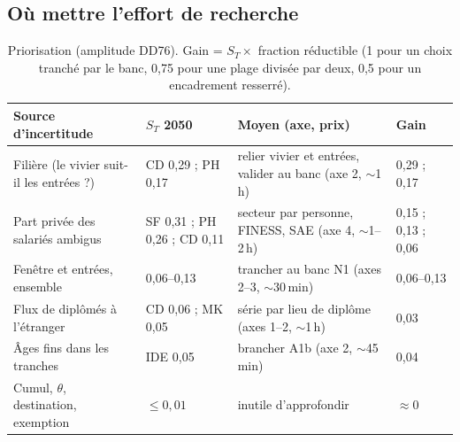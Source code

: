\documentclass[11pt]{article}
\begin{document}
\subsection{Où mettre l'effort de recherche}
\begin{table}[h]\centering\small
\begin{tabular}{p{4cm}p{3.1cm}p{4.5cm}p{2.2cm}}
\toprule
Source d'incertitude & $S_T$ 2050 & Moyen (axe, prix\suppose{}) & Gain\derive{} \\
\midrule
Filière (le vivier suit-il les entrées ?) & CD 0,29 ; PH 0,17\mesure{} & relier vivier et entrées, valider au banc (axe 2, $\sim$1\,h) & 0,29 ; 0,17 \\
Part privée des salariés ambigus & SF 0,31 ; PH 0,26 ; CD 0,11\mesure{} & secteur par personne, FINESS, SAE (axe 4, $\sim$1--2\,h) & 0,15 ; 0,13 ; 0,06 \\
Fenêtre et entrées, ensemble & 0,06--0,13\mesure{} & trancher au banc N1 (axes 2--3, $\sim$30\,min) & 0,06--0,13 \\
Flux de diplômés à l'étranger & CD 0,06 ; MK 0,05\mesure{} & série par lieu de diplôme (axes 1--2, $\sim$1\,h) & 0,03 \\
Âges fins dans les tranches & IDE 0,05\mesure{} & brancher A1b (axe 2, $\sim$45\,min) & 0,04 \\
Cumul, $\theta$, destination, exemption & $\le 0{,}01$\mesure{} & inutile d'approfondir & $\approx 0$ \\
\bottomrule
\end{tabular}
\caption{Priorisation (amplitude DD76). Gain = $S_T \times$ fraction réductible (1 pour un choix tranché par le
banc, 0,75 pour une plage divisée par deux, 0,5 pour un encadrement resserré).}\label{tab:prio}
\end{table}
\end{document}

